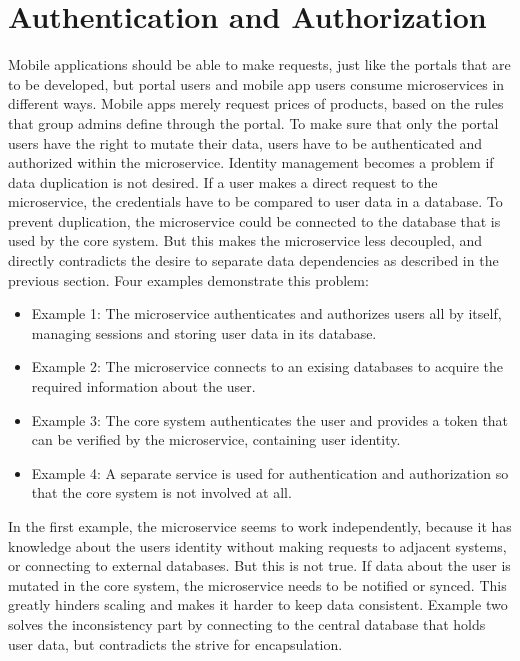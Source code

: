 \section{Authentication and Authorization}
Mobile applications should be able to make requests, just like the portals that are to be developed, but portal users and mobile app users consume microservices in different ways. Mobile apps merely request prices of products, based on the rules that group admins define through the portal. To make sure that only the portal users have the right to mutate their data, users have to be authenticated and authorized within the microservice. Identity management becomes a problem if data duplication is not desired. If a user makes a direct request to the microservice, the credentials have to be compared to user data in a database. To prevent duplication, the microservice could be connected to the database that is used by the core system. But this makes the microservice less decoupled, and directly contradicts the desire to separate data dependencies as described in the previous section. Four examples demonstrate this problem:

\begin{itemize}
	\item Example 1: The microservice authenticates and authorizes users all by itself, managing sessions and storing user data in its database.
	\item Example 2: The microservice connects to an exising databases to acquire the required information about the user.
	\item Example 3: The core system authenticates the user and provides a token that can be verified by the microservice, containing user identity.
	\item Example 4: A separate service is used for authentication and authorization so that the core system is not involved at all.
\end{itemize}

In the first example, the microservice seems to work independently, because it has knowledge about the users identity without making requests to adjacent systems, or connecting to external databases. But this is not true. If data about the user is mutated in the core system, the microservice needs to be notified or synced. This greatly hinders scaling and makes it harder to keep data consistent. Example two solves the inconsistency part by connecting to the central database that holds user data, but contradicts the strive for encapsulation.

